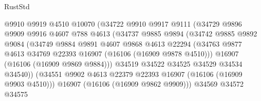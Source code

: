 \begin{lexlean}{RustStd}
\begin{coremodule}
                                @9910
                                @9919
                                @4510
                                @10070
                                (@34722
                                  @9910
                                  @9917
                                  @9111
                                  (@34729
                                    @9896
                                    @9909
                                    @9916
                                    @4607
                                    @788
                                    @4613
                                    (@34737
                                      @9885
                                      @9894
                                      (@34742
                                        @9885
                                        @9892
                                        @9084
                                        (@34749
                                          @9884
                                          @9891
                                          @4607
                                          @9868
                                          @4613
                                          @22294
                                          (@34763
                                            @9877
                                            @4613
                                            @34769
                                            @22393
                                            @16907
                                            (@16106 (@16909 @9878 @4510)))
                                          @16907
                                          (@16106 (@16909 @9869 @9884)))
                                        @34519
                                        @34522
                                        @34525
                                        @34529
                                        @34534
                                        @34540))
                                    (@34551
                                      @9902
                                      @4613
                                      @22379
                                      @22393
                                      @16907
                                      (@16106 (@16909 @9903 @4510)))
                                    @16907
                                    (@16106 (@16909 @9862 @9909)))
                                  @34569
                                  @34572
                                  @34575

\end{coremodule}
\end{lexlean}
